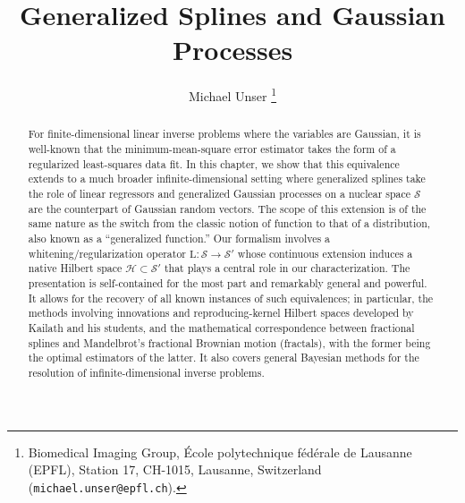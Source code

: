 \documentclass[11pt, english,english]{article}
\def\Spc#1{{\mathcal{#1}}}  %
\def\Op#1{{\mathrm{#1}}}  %
\renewcommand{\[}{\begin{equation}}
\renewcommand{\]}[1]{\label{eq:#1}\end{equation}}
\begin{document}

\title{Generalized Splines and Gaussian Processes}
\author{
Michael Unser
\thanks{Biomedical Imaging Group, \'Ecole polytechnique f\'ed\'erale de Lausanne (EPFL),
Station 17, CH-1015, Lausanne, Switzerland ({\tt michael.unser@epfl.ch}). }
 }


\maketitle

\begin{abstract}
For finite-dimensional linear inverse problems where the variables are Gaussian, it is well-known that the minimum-mean-square error estimator takes the form of a regularized least-squares data fit.  In this chapter, we show that this equivalence extends to a much broader infinite-dimensional setting where generalized splines take the role of linear regressors and generalized Gaussian processes on a nuclear space $\Spc S$ are the counterpart of Gaussian random vectors. The scope of this extension is of the same nature as the switch from the classic notion of function to that of a distribution, also known as a ``generalized function.''
Our formalism involves a whitening/regularization operator $\Op L: \Spc S\to \Spc S'$ whose continuous extension induces a native Hilbert space $\Spc H\subset \Spc S'$ that plays a central role in our characterization. The presentation is self-contained for the most part and remarkably general and powerful. It allows for the recovery of all known instances of such equivalences; in particular, the methods
involving innovations and reproducing-kernel Hilbert spaces developed by Kailath and his students, and the mathematical correspondence between fractional splines and Mandelbrot's fractional Brownian motion (fractals), with the former being the optimal estimators of the latter. It also covers general Bayesian methods for the resolution of infinite-dimensional inverse problems.
\end{abstract}

\newpage
\tableofcontents


\newpage
\end{document}
